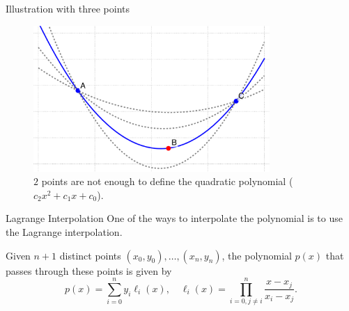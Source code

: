 \documentclass{beamer}
\begin{document}
    \begin{frame}{Illustration with three points}
      \begin{figure}
        \includegraphics[width=0.8\textwidth]{images/lecture_1/shamir_demo.pdf}
        \caption{$2$ points are not enough to define the quadratic polynomial ($c_2x^2+c_1x+c_0$).}
        \label{fig:interpolation}
      \end{figure}
    \end{frame}

    \begin{frame}{Lagrange Interpolation}
      One of the ways to interpolate the polynomial is to use the Lagrange interpolation.

      \begin{theorem}
        Given $n+1$ distinct points $(x_0,y_0),\dots,(x_n,y_n)$, the polynomial $p(x)$ that passes through these points is given by
        \begin{equation*}
            p(x) = \sum_{i=0}^{n} y_i \ell_i(x), \quad \ell_i(x) = \prod_{i=0, j \neq i}^n \frac{x-x_j}{x_i-x_j}.
        \end{equation*}
    \end{theorem}
    \end{frame}
\end{document}
